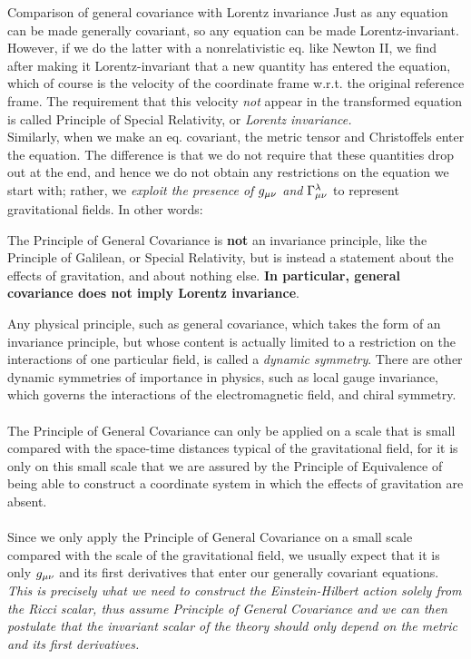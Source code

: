 \begin{mybox}{Comparison of general covariance with Lorentz invariance}
	Just as any equation can be made generally covariant, so any equation can be made Lorentz-invariant. However, if we do the latter with a nonrelativistic eq. like Newton II, we find after making it Lorentz-invariant that a new quantity has entered the equation, which of course is the velocity of the coordinate frame w.r.t. the original reference frame. The requirement that this velocity \emph{not} appear in the transformed equation is called Principle of Special Relativity, or \emph{Lorentz invariance.}  \\
	Similarly, when we make an eq. covariant, the metric tensor and Christoffels enter the equation. The difference is that we do not require that these quantities drop out at the end, and hence we do not obtain any restrictions on the equation we start with; rather, we \emph{exploit the presence of $g_{\mu \nu}$ and $\Gamma^\lambda_{\mu \nu}$} to represent gravitational fields. In other words:
	\begin{statements}
		The Principle of General Covariance is \textbf{not} an invariance principle, like the Principle of Galilean, or Special Relativity, but is instead a statement about the effects of gravitation, and about nothing else. \textbf{In particular, general covariance does not imply Lorentz invariance}.
	\end{statements}
\end{mybox}
Any physical principle, such as general covariance, which takes the form of an invariance principle, but whose content is actually limited to a restriction on the interactions of one particular field, is called a \emph{dynamic symmetry}. There are other dynamic symmetries of importance in physics, such as local gauge invariance, which governs the interactions of the electromagnetic field, and chiral symmetry.\\
\\
The Principle of General Covariance can only be applied on a scale that is small compared with the space-time distances typical of the gravitational field, for it is only on this small scale that we are assured by the Principle of Equivalence of being able to construct a coordinate system in which the effects of gravitation are absent.\\
\\
Since we only apply the Principle of General Covariance on a small scale compared with the scale of the gravitational field, we usually expect that it is only $g_{\mu \nu}$ and its first derivatives that enter our generally covariant equations. \emph{This is precisely what we need to construct the Einstein-Hilbert action solely from the Ricci scalar, thus assume Principle of General Covariance and we can then postulate that the invariant scalar of the theory should only depend on the metric and its first derivatives.}
